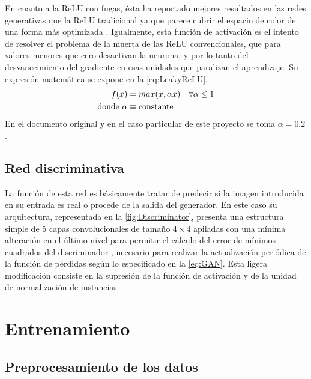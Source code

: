 En cuanto a la ReLU con fugas, ésta ha reportado mejores resultados en las redes generativas que la ReLU tradicional ya que parece cubrir el espacio de color de una forma más optimizada \cite{GAN}. Igualmente, esta función de activación es el intento de resolver el problema de la muerta de las ReLU convencionales, que para valores menores que cero desactivan la neurona, y por lo tanto del desvanecimiento del gradiente en esas unidades que paralizan el aprendizaje. Su expresión matemática se expone en la \autoref{eq:LeakyReLU}.
\begin{align} \label{eq:LeakyReLU}
    f(x) &= max(x, \alpha x) &\forall \alpha \leq 1 \\
    \text{donde}~ 
    \alpha &\equiv \text{constante} \notag
\end{align}
En el documento original y en el caso particular de este proyecto se toma $\alpha = 0.2$.

\subsection{Red discriminativa}

La función de esta red es básicamente tratar de predecir si la imagen introducida en su entrada es real o procede de la salida del generador. En este caso su arquitectura, representada en la \autoref{fig:Discriminator}, presenta una estructura simple de 5 capas convolucionales de tamaño $4\times 4$ apiladas con una mínima alteración en el último nivel para permitir el cálculo del error de mínimos cuadrados del discriminador \cite{LSGAN}, necesario para realizar la actualización periódica de la función de pérdidas según lo especificado en la \autoref{eq:GAN}. Esta ligera modificación consiste en la supresión de la función de activación y de la unidad de normalización de instancias.

\section{Entrenamiento}

\subsection{Preprocesamiento de los datos}

